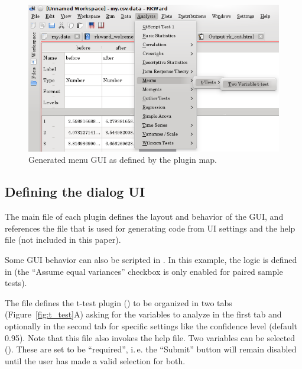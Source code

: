 \begin{figure}[htp]
 \centering
 \includegraphics{../figures/ttest-gui-example.png}
 \caption{Generated menu GUI as defined by the plugin map.}
 \label{fig:ttest-gui-example}
\end{figure}


\subsection {Defining the dialog UI}
\label{sec:defining_dialog_ui}
The main  file of each plugin defines the layout and behavior of the GUI, and references the
 file that is used for generating  code from UI settings and the help file (not included in this paper).

Some GUI behavior can also be scripted in . In this example, the logic is defined in  (the ``Assume equal variances'' checkbox
is only enabled for paired sample tests).

The  file defines the t-test plugin () to be organized in two tabs (Figure~\ref{fig:t_test}A) asking for the variables
to analyze in the first tab and optionally in the second tab for specific settings like the confidence level (default 0.95). Note that this  file
also invokes the  help file. Two variables can be selected (). These are set to be ``required'', i.\,e.
the ``Submit'' button will remain disabled until the user has made a valid selection for both.

